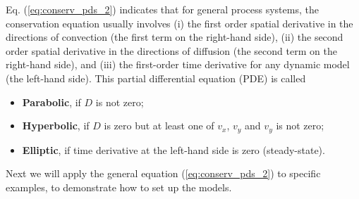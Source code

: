 \documentclass[a4paper,11pt]{article}
\theoremstyle{definition}
\begin{document}
Eq. (\ref{eq:conserv_pds_2}) indicates that for general process systems,
the conservation equation usually involves (i) the first order spatial derivative in the directions of convection
(the first term on the right-hand side), (ii) the second order spatial derivative in the directions of diffusion
(the second term on the right-hand side), and (iii) the first-order time derivative for any dynamic model (the left-hand side).
This partial differential equation (PDE) is called
\begin{itemize}
	\item \textbf{Parabolic}, if $D$ is not zero;
	\item \textbf{Hyperbolic}, if $D$ is zero but at least one of $v_x$, $v_y$ and $v_y$ is not zero;
	\item \textbf{Elliptic}, if time derivative at the left-hand side is zero (steady-state).
\end{itemize}

Next we will apply the general equation (\ref{eq:conserv_pds_2}) to specific examples,
to demonstrate how to set up the models.
\end{document}
